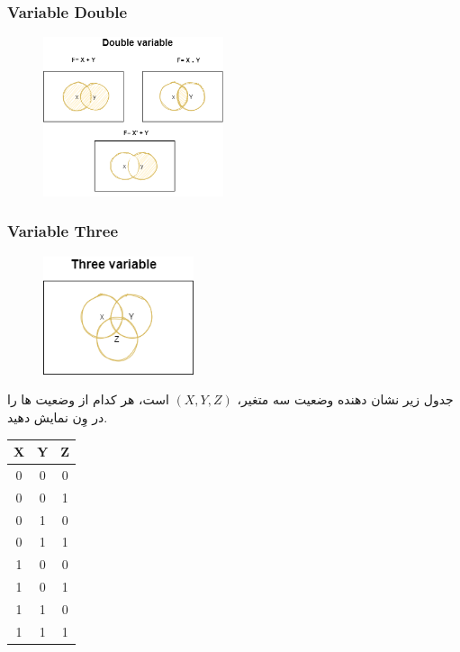 \documentclass[pt, a5paper]{article}
\begin{document}
\subsubsection{Variable Double}

\begin{figure}[htbp]
	\centerline{\includegraphics[width=150pt]{img/venn/venn-double Variable.png}}
\end{figure}
\newpage
\subsubsection{Variable Three}

\begin{figure}[htbp]
	\centerline{\includegraphics[width=125pt]{img/venn/venn-three_variable.png}}
\end{figure}
جدول زیر نشان دهنده وضعیت سه متغیر، $(X, Y, Z)$ است، هر کدام از وضعیت ها را در وِن نمایش دهید.

\center 
\begin{LTR}
	\begin{tabular}{ c c c }
		X & Y & Z \\
		\hline
		0 & 0 & 0 \\ 				
		0 & 0 & 1 \\
		0 & 1 & 0 \\
		0 & 1 & 1 \\
		1 & 0 & 0 \\
		1 & 0 & 1 \\
		1 & 1 & 0 \\
		1 & 1 & 1 \\	
	\end{tabular}
\end{LTR}
\end{document}
